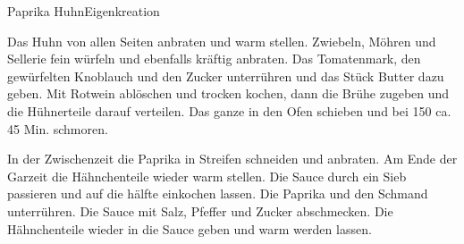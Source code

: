 \begin{recipe}{Paprika Huhn}{Eigenkreation}
  \label{Paprikahuhn}
  \inglist
  \steps

  Das Huhn von allen Seiten anbraten und warm stellen. Zwiebeln, Möhren und
  Sellerie fein würfeln und ebenfalls kräftig anbraten. Das Tomatenmark, den
  gewürfelten Knoblauch und den Zucker unterrühren und das Stück Butter dazu
  geben. Mit Rotwein ablöschen und trocken kochen, dann die Brühe zugeben und
  die Hühnerteile darauf verteilen. Das ganze in den Ofen schieben und bei 150
  \celsius ca. 45 Min. schmoren.

  In der Zwischenzeit die Paprika in Streifen schneiden und anbraten. Am Ende
  der Garzeit die Hähnchenteile wieder warm stellen. Die Sauce durch ein Sieb
  passieren und auf die hälfte einkochen lassen. Die Paprika und den Schmand
  unterrühren. Die Sauce mit Salz, Pfeffer und Zucker abschmecken. Die
  Hähnchenteile wieder in die Sauce geben und warm werden lassen.

\end{recipe}
